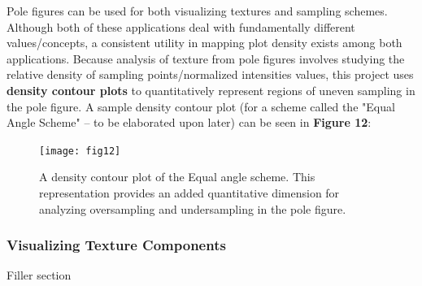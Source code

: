 \documentclass[10pt]{article}
\begin{document}
Pole figures can be used for both visualizing textures and sampling schemes. Although both of these applications deal with 
fundamentally different values/concepts, a consistent utility in mapping plot density exists among both applications. Because analysis of texture from pole figures involves studying the relative density of sampling points/normalized intensities values, 
this project uses \textbf{density contour plots} to quantitatively represent regions of uneven sampling in the pole figure. A sample density
contour plot (for a scheme called the "Equal Angle Scheme" -- to be elaborated upon later) can be seen in \textbf{Figure 12}:

\begin{figure}[h]
    \centering
    \texttt{[image: fig12]}
    \caption{\label{tab1}A density contour plot of the Equal angle scheme. 
    This representation provides an added quantitative dimension for analyzing oversampling and undersampling in the pole figure.} 
    \end{figure}



\subsubsection{Visualizing Texture Components}
Filler section 
\end{document}
